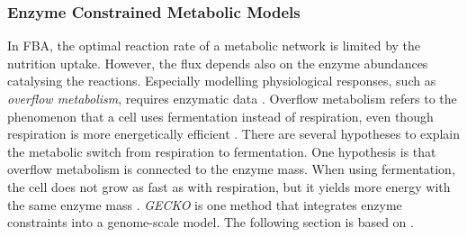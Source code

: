\subsubsection{Enzyme Constrained Metabolic Models}
In FBA, the optimal reaction rate of a metabolic network is limited by the nutrition uptake. However, the flux depends also on the enzyme abundances catalysing the reactions. Especially modelling physiological responses, such as \textit{overflow metabolism}, requires enzymatic data \cite{improving_phenotype_predictions}. Overflow metabolism refers to the phenomenon that a cell uses fermentation instead of respiration, even though respiration is more energetically efficient \cite{overflow}. There are several hypotheses to explain the metabolic switch from respiration to fermentation. One hypothesis is that overflow metabolism is connected to the enzyme mass. When using fermentation, the cell does not grow as fast as with respiration, but it yields more energy with the same enzyme mass \cite{improving_phenotype_predictions}.  
\textit{GECKO} is one method that integrates enzyme constraints into a genome-scale model. The following section is based on \cite{improving_phenotype_predictions}. 

